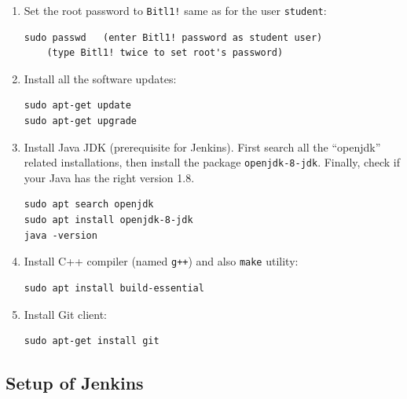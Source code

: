 \documentclass[11pt,a4paper]{article}
\begin{document}
\begin{enumerate}
\item Set the root password to {\tt Bitl1!} \textendash{} same as for the user {\tt student}:
\begin{verbatim}
sudo passwd   (enter Bitl1! password as student user)
    (type Bitl1! twice to set root's password)
\end{verbatim}
\item Install all the software updates:
\begin{verbatim}
sudo apt-get update
sudo apt-get upgrade
\end{verbatim}
\item Install Java JDK (prerequisite for Jenkins). First search all the ``openjdk'' related installations, 
then install the package {\tt openjdk-8-jdk}. Finally, check if your Java has the right version 1.8.
\begin{verbatim}
sudo apt search openjdk
sudo apt install openjdk-8-jdk
java -version
\end{verbatim}
\item Install C++ compiler (named {\tt g++}) and also {\tt make} utility:
\begin{verbatim}
sudo apt install build-essential
\end{verbatim}
\item Install Git client:
\begin{verbatim}
sudo apt-get install git
\end{verbatim}
\end{enumerate}



\subsection{Setup of Jenkins}
\end{document}
